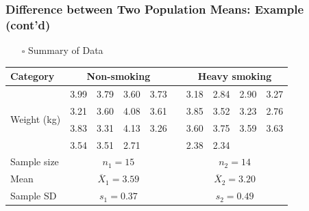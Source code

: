 \documentclass[handout]{beamer}
\begin{document}
\begin{frame}
    \frametitle{Difference between Two Population Means: Example (cont'd)}
    \begin{itemize}[wide = 0pt]
        \item[$\square$] Summary of Data
    \end{itemize}
    \begin{tabular}{l c c c c c c c c c}
    \toprule
        Category & \multicolumn{4}{c}{\textbf{Non-smoking}} & & \multicolumn{4}{c}{\textbf{Heavy smoking}} \\
        \midrule
        \multirow{4}{*}{Weight (kg)} & \small{3.99} & \small{3.79} & \small{3.60} & \small{3.73} & & \small{3.18} & \small{2.84} & \small{2.90} & \small{3.27} \\
        & \small{3.21} & \small{3.60} & \small{4.08} & \small{3.61} & & \small{3.85} & \small{3.52} & \small{3.23} & \small{2.76} \\
        & \small{3.83} & \small{3.31} & \small{4.13} & \small{3.26} & & \small{3.60} & \small{3.75} & \small{3.59} & \small{3.63} \\
        & \small{3.54} & \small{3.51} & \small{2.71} & & & \small{2.38} & \small{2.34} & & \\
        \midrule
        Sample size & \multicolumn{4}{c}{\small{$n_1=15$}} & & \multicolumn{4}{c}{\small{$n_2=14$}} \\
        Mean &  \multicolumn{4}{c}{\small{$\overline{X}_1=3.59$}} & & \multicolumn{4}{c}{\small{$\overline{X}_2=3.20$}} \\
        Sample SD &  \multicolumn{4}{c}{\small{$s_1=0.37$}} & & \multicolumn{4}{c}{\small{$s_2=0.49$}} \\
        \bottomrule
    \end{tabular}
    \vspace*{\fill}
\end{frame}
\end{document}
